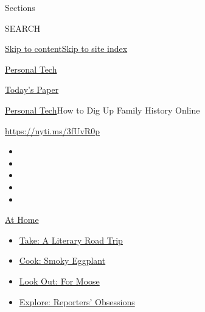 Sections

SEARCH

\protect\hyperlink{site-content}{Skip to
content}\protect\hyperlink{site-index}{Skip to site index}

\href{https://www.nytimes3xbfgragh.onion/section/technology/personaltech}{Personal
Tech}

\href{https://myaccount.nytimes3xbfgragh.onion/auth/login?response_type=cookie\&client_id=vi}{}

\href{https://www.nytimes3xbfgragh.onion/section/todayspaper}{Today's
Paper}

\href{/section/technology/personaltech}{Personal Tech}\textbar{}How to
Dig Up Family History Online

\href{https://nyti.ms/3fUvR0p}{https://nyti.ms/3fUvR0p}

\begin{itemize}
\item
\item
\item
\item
\item
\end{itemize}

\href{https://www.nytimes3xbfgragh.onion/spotlight/at-home?action=click\&pgtype=Article\&state=default\&region=TOP_BANNER\&context=at_home_menu}{At
Home}

\begin{itemize}
\tightlist
\item
  \href{https://www.nytimes3xbfgragh.onion/2020/07/28/books/time-for-a-literary-road-trip.html?action=click\&pgtype=Article\&state=default\&region=TOP_BANNER\&context=at_home_menu}{Take:
  A Literary Road Trip}
\item
  \href{https://www.nytimes3xbfgragh.onion/2020/07/29/magazine/bored-with-your-home-cooking-some-smoky-eggplant-will-fix-that.html?action=click\&pgtype=Article\&state=default\&region=TOP_BANNER\&context=at_home_menu}{Cook:
  Smoky Eggplant}
\item
  \href{https://www.nytimes3xbfgragh.onion/2020/07/27/travel/moose-michigan-isle-royale.html?action=click\&pgtype=Article\&state=default\&region=TOP_BANNER\&context=at_home_menu}{Look
  Out: For Moose}
\item
  \href{https://www.nytimes3xbfgragh.onion/interactive/2020/at-home/even-more-reporters-editors-diaries-lists-recommendations.html?action=click\&pgtype=Article\&state=default\&region=TOP_BANNER\&context=at_home_menu}{Explore:
  Reporters' Obsessions}
\end{itemize}

